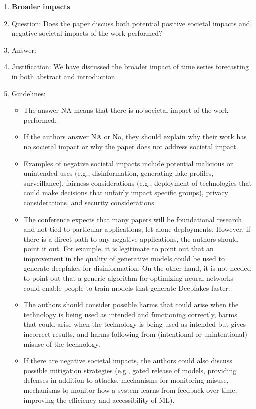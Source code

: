 \documentclass{article}
\begin{document}
\begin{enumerate}
\item {\bf Broader impacts}
    \item[] Question: Does the paper discuss both potential positive societal impacts and negative societal impacts of the work performed?
    \item[] Answer: \answerNA{} %
    \item[] Justification: We have discussed the broader impact of time series forecasting in both abstract and introduction.
    \item[] Guidelines:
    \begin{itemize}
        \item The answer NA means that there is no societal impact of the work performed.
        \item If the authors answer NA or No, they should explain why their work has no societal impact or why the paper does not address societal impact.
        \item Examples of negative societal impacts include potential malicious or unintended uses (e.g., disinformation, generating fake profiles, surveillance), fairness considerations (e.g., deployment of technologies that could make decisions that unfairly impact specific groups), privacy considerations, and security considerations.
        \item The conference expects that many papers will be foundational research and not tied to particular applications, let alone deployments. However, if there is a direct path to any negative applications, the authors should point it out. For example, it is legitimate to point out that an improvement in the quality of generative models could be used to generate deepfakes for disinformation. On the other hand, it is not needed to point out that a generic algorithm for optimizing neural networks could enable people to train models that generate Deepfakes faster.
        \item The authors should consider possible harms that could arise when the technology is being used as intended and functioning correctly, harms that could arise when the technology is being used as intended but gives incorrect results, and harms following from (intentional or unintentional) misuse of the technology.
        \item If there are negative societal impacts, the authors could also discuss possible mitigation strategies (e.g., gated release of models, providing defenses in addition to attacks, mechanisms for monitoring misuse, mechanisms to monitor how a system learns from feedback over time, improving the efficiency and accessibility of ML).
    \end{itemize}
    

\end{enumerate}
\end{document}
